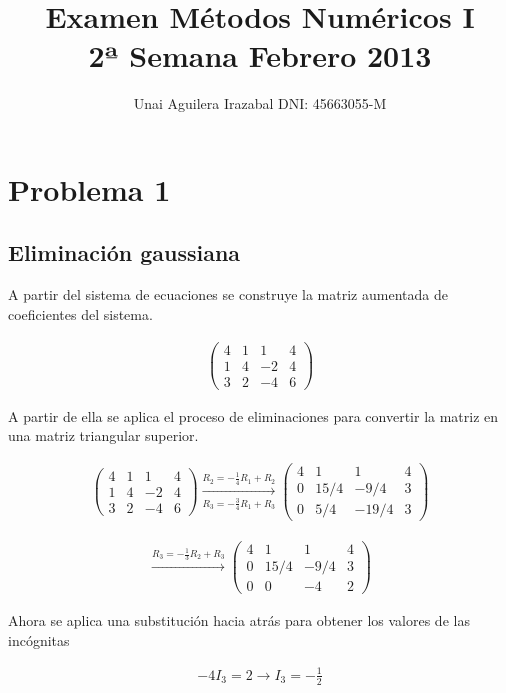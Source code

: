 \documentclass[a4paper, 12pt]{article}
\title{Examen Métodos Numéricos I \\ 2ª Semana Febrero 2013}
\author{Unai Aguilera Irazabal DNI: 45663055-M}
\begin{document}
\maketitle

\section*{Problema 1}
\subsection*{Eliminación gaussiana}
A partir del sistema de ecuaciones se construye la matriz aumentada de
coeficientes del sistema.

\begin{align*}
\begin{pmatrix}
  4 & 1 & 1 & 4\\
  1 & 4 & -2 & 4 \\
  3 & 2 & -4 & 6
\end{pmatrix}
\end{align*}

A partir de ella se aplica el proceso de eliminaciones para convertir la 
matriz en una matriz triangular superior.

\begin{align*}
\begin{pmatrix}
  4 & 1 & 1 & 4\\
  1 & 4 & -2 & 4 \\
  3 & 2 & -4 & 6
\end{pmatrix} 
\xrightarrow[R_3 = -\frac{3}{4}R_1 + R_3]{R_2 = -\frac{1}{4}R_1 + R_2}
\begin{pmatrix}
  4 & 1 & 1 & 4\\
  0 & 15/4 & -9/4 & 3 \\
  0 & 5/4 & -19/4 & 3
\end{pmatrix}
\end{align*}

\begin{align*}
\xrightarrow{R_3 = -\frac{1}{3}R_2 + R_3}
\begin{pmatrix}
  4 & 1 & 1 & 4\\
  0 & 15/4 & -9/4 & 3 \\
  0 & 0 & -4 & 2
\end{pmatrix}
\end{align*}

Ahora se aplica una substitución hacia atrás para obtener los valores de las
incógnitas

\begin{align*}
-4I_3 = 2
\rightarrow
I_3 = -\frac{1}{2}
\end{align*}
\end{document}
